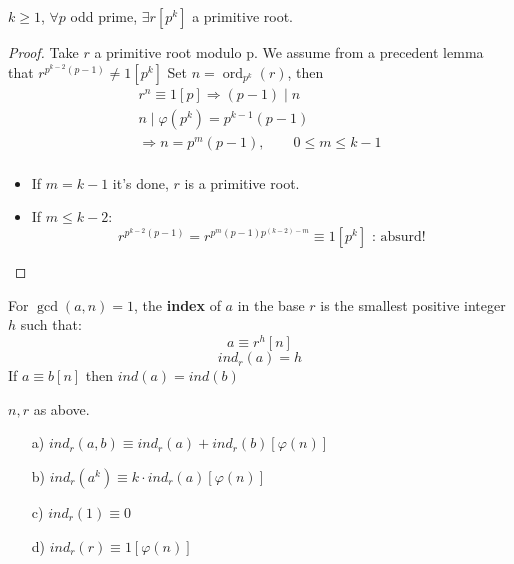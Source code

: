 \documentclass{report}
\DeclareMathOperator{\ord}{ord}
\begin{document}
\begin{thm} $k\geq 1$, $\forall p$ odd prime, $\exists r[p^k]$ a primitive root.
\end{thm}
\begin{proof} Take $r$ a primitive root modulo p. We assume from a precedent lemma that $r^{p^{k-2}(p-1)} \neq 1[p^k]$
							Set $n=\ord_{p^k}(r)$, then \[\begin{array}{lcl}
																						r^n\equiv 1[p] \Rightarrow (p-1)\mid n\\
																						n\mid\varphi(p^k)=p^{k-1}(p-1)\\
																						\Rightarrow n=p^m(p-1),\qquad 0\leq m \leq k-1\\
																						\end{array}\]
							\begin{itemize}
										\item If $m=k-1$ it's done, $r$ is a primitive root.
										\item If $m \leq k-2$:
													\[r^{p^{k-2}(p-1)}=r^{p^m(p-1)p^{(k-2)-m}} \equiv 1 [p^k] \text{ : absurd!}\]
							\end{itemize}
\end{proof}
\begin{defi} For $\gcd(a,n)=1$, the \textbf{index} of $a$ in the base $r$ is the smallest positive integer $h$ such that:\[a \equiv r^h[n] \]
																																																												\[ind_r(a)=h\]
						If $a\equiv b[n]$ then $ind(a)=ind(b)$
\end{defi}
\begin{thm} $n,r$ as above.
						\begin{itemize}
									\item[a)] $ind_r(a,b)\equiv ind_r(a)+ind_r(b)[\varphi(n)]$
									\item[b)] $ind_r(a^k) \equiv k \cdot ind_r(a)[\varphi(n)]$
									\item[c)] $ind_r(1)\equiv 0$
									\item[d)] $ind_r(r)\equiv 1[\varphi(n)]$
						\end{itemize}			
\end{thm}
\newpage
\end{document}
